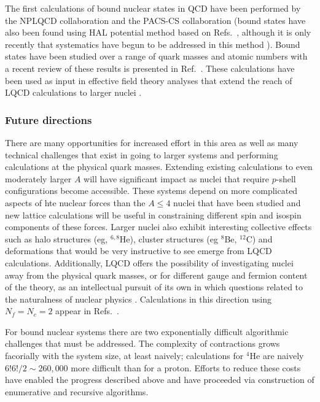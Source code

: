 The first calculations of bound nuclear states in QCD have been performed by the NPLQCD collaboration \cite{} and the PACS-CS collaboration (bound states have also been found using HAL potential method \cite{} based on Refs.~\cite{}, although it is only recently that systematics have begun to be addressed in this method \cite{}). Bound states have been studied over a range of quark masses and atomic numbers with a recent review of these results is presented in Ref.~\cite{}. These calculations have been used as input in effective field theory analyses that extend the reach of LQCD calculations to larger nuclei \cite{Barnea:2013uqa,MORE}.

\subsubsection{Future directions}
There are many opportunities for increased effort in this area as well as many technical challenges that exist in going to larger systems and performing calculations at the physical quark masses. 
Extending existing calculations to even moderately larger $A$ will have significant impact as nuclei that require $p$-shell configurations become accessible. These systems depend on more complicated aspects of hte nuclear forces than the $A\le4$ nuclei that have been studied and new lattice calculations will be useful in constraining different spin and isospin components of these forces. Larger nuclei also exhibit interesting collective effects such as halo structures (eg,  ${}^{6,8}$He), cluster structures (eg ${}^{8}$Be, ${}^{12}$C) and deformations that would be very instructive to see emerge from LQCD calculations. Additionally, LQCD offers the possibility of investigating nuclei away from the physical quark masses, or for different gauge and fermion content of the theory, as an intellectual pursuit of its own in which questions related to the naturalness of nuclear physics \cite{Orginos:2015aya}. Calculations in this direction using $N_f=N_c=2$ appear in Refs.~\cite{Detmold:2014qqa,Detmold:2014kba}.

For bound nuclear systems there are two exponentially difficult algorithmic challenges that must be addressed. The complexity of contractions grows 
facorially with the system size, at least naively; calculations for $^4$He are naively $6!6!/2\sim 260,000$ more difficult than for a proton. Efforts to reduce these costs have enabled the progress described above and have proceeded via construction of enumerative \cite{Doi:2012xd,Gunther:2013xj} and recursive \cite{Detmold:2012eu} algorithms. 

